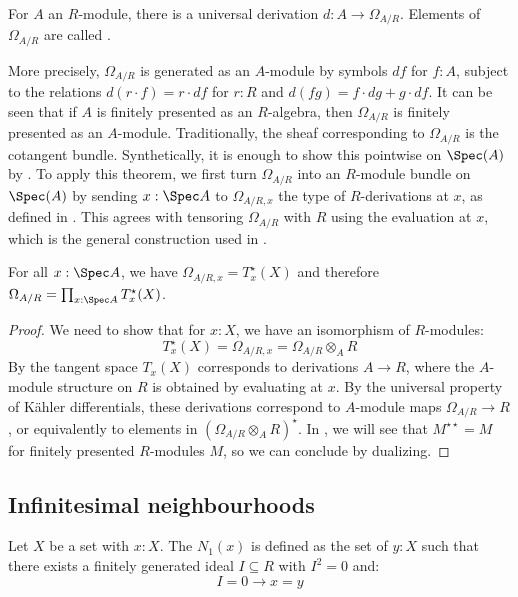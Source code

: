 \begin{definition}
For $A$ an $R$-module, there is a universal derivation $d : A \to \Omega_{A/R}$. Elements of $\Omega_{A/R}$ are called .
\end{definition}

More precisely, $\Omega_{A/R}$ is generated as an $A$-module by symbols
$df$ for $f : A$, subject to the relations $d(r\cdot f) = r \cdot df$ for $r : R$ and
$d(fg) = f \cdot dg + g \cdot df$.
It can be seen that if $A$ is finitely presented as an $R$-algebra,
then $\Omega_{A/R}$ is finitely presented as an $A$-module.
Traditionally, the sheaf corresponding to $\Omega_{A/R}$ is the cotangent bundle.
Synthetically, it is enough to show this pointwise on $\Spec(A)$ by \cite[Theorem 8.2.3]{draft}.
To apply this theorem, we first turn $\Omega_{A/R}$ into an $R$-module bundle on $\Spec(A)$ by sending $x:\Spec A$ to $\Omega_{A/R,x}$ the type of $R$-derivations at $x$, as defined in . This agrees with tensoring $\Omega_{A/R}$ with $R$ using the evaluation at $x$, which is the general construction used in \cite[Theorem 8.2.3]{draft}.

\begin{remark}
For all $x:\Spec A$, we have $\Omega_{A/R,x} = T_x^\star(X)$ and therefore $\Omega_{A/R} = \prod_{x:\Spec A} T_x^\star(X)$.
\end{remark}

\begin{proof}
We need to show that for $x : X$,
   we have an isomorphism of $R$-modules:
   \[ T^\star_x(X) = \Omega_{A/R,x}=\Omega_{A/R} \otimes_A R\]
By  the tangent space $T_x(X)$ corresponds to derivations
$A \to R$, where the $A$-module structure on $R$ is obtained by evaluating at $x$.
By the universal property of Kähler differentials, these derivations correspond to $A$-module maps $\Omega_{A/R} \to R$, or equivalently to elements in $(\Omega_{A/R}\otimes_AR)^\star$. In , we will see that $M^{\star\star} = M$ for finitely presented $R$-modules $M$, so we can conclude by dualizing.
\end{proof}

\subsection{Infinitesimal neighbourhoods}

\begin{definition}
Let $X$ be a set with $x:X$. The  $N_1(x)$ is defined as the set of $y:X$ such that there exists a finitely generated ideal $I\subseteq R$ with $I^{2}=0$ and:
\[I=0 \to x=y\]
\end{definition}

